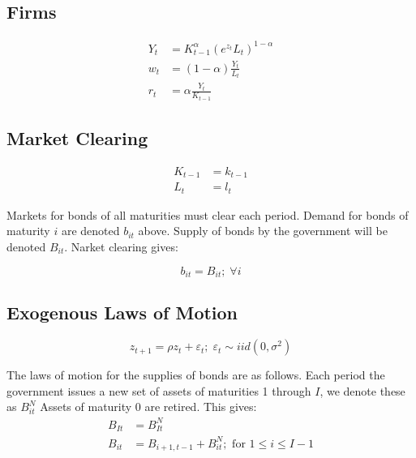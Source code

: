 \documentclass[letterpaper,11pt]{article}
\theoremstyle{definition}
\numberwithin{equation}{section}
\newcommand\ve{\varepsilon}
\begin{document}
\begin{spacing}{1.5}
	\subsection{Firms}

		\begin{align}
			Y_t & = K_{t-1}^\alpha (e^{z_t} L_t)^{1-\alpha} \label{eq_Ydef} \\
			w_t & = (1-\alpha) \frac{Y_t}{L_t} \label{eq_wdef} \\
			r_t & = \alpha \frac{Y_t}{K_{t-1}} \label{eq_rdef}
		\end{align}


	\subsection{Market Clearing}

		\begin{align}
			K_{t-1} & = k_{t-1} \label{eq_Kmkt} \\
			L_t & = l_t \label{eq_Lmkt}
		\end{align}

		Markets for bonds of all maturities must clear each period.  Demand for bonds of maturity $i$ are denoted $b_{it}$ above.  Supply of bonds by the government will be denoted $B_{it}$.  Narket clearing gives:

		\begin{equation}
			b_{it} = B_{it}; \; \forall i \label{eq_bmkt}
		\end{equation}

	\subsection{Exogenous Laws of Motion}

		\begin{equation}
			z_{t+1} = \rho z_t + \ve_t; \; \ve_t \sim iid(0, \sigma^2) \label{eq_zlom}
		\end{equation}
		
		The laws of motion for the supplies of bonds are as follows.  Each period the government issues a new set of assets of maturities 1 through $I$, we denote these as $B^N_{it}$  Assets of maturity 0 are retired.  This gives:
		\begin{align}
			B_{It} & = B^N_{It} \label{eq_B1lom} \\
			B_{it} & = B_{i+1,t-1} + B^N_{it}; \text{ for } 1 \le i \le I-1 \label{eq_Blom}
		\end{align}


\end{spacing}
\end{document}
